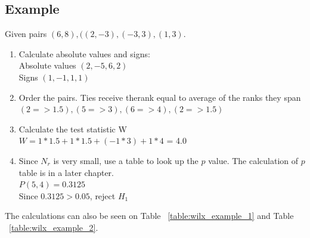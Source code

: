 \documentclass[12pt]{article}
\begin{document}
\subsection{Example}
Given pairs $(6, 8), ((2, -3), (-3, 3), (1, 3)$.

\begin{enumerate}
\item Calculate absolute values and signs: \\
Absolute values $(2, -5, 6, 2)$ \\
Signs $(1, -1, 1, 1)$
\item Order the pairs. Ties receive therank equal to average of the ranks they span \\
$(2 => 1.5), (5 => 3), (6 => 4), (2 => 1.5)$
\item Calculate the test statistic W \\
$W = 1*1.5+ 1*1.5 + (-1*3) + 1*4 $ = 4.0
\item Since $N_r$ is very small, use a table to look up the $p$ value. The calculation of $p$ table is in a later chapter. \\
$P(5, 4) = 0.3125$ \\
Since $0.3125 > 0.05$, reject $H_1$
\end{enumerate}

The calculations can also be seen on Table ~\ref{table:wilx_example_1} and Table ~\ref{table:wilx_example_2}.
\end{document}
